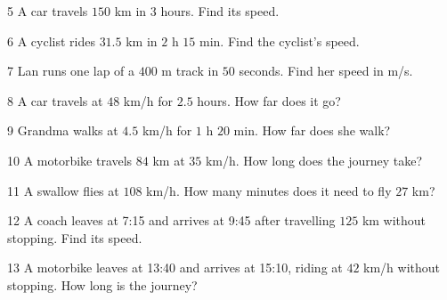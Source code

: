 \gap
\begin{probbox}{5}{\relax}
A car travels $150$ km in $3$ hours. Find its speed.
\end{probbox}
\gap
\begin{probbox}{6}{\relax}
A cyclist rides $31.5$ km in $2$ h $15$ min. Find the cyclist's speed.
\end{probbox}
\gap
\begin{probbox}{7}{\relax}
Lan runs one lap of a $400$ m track in $50$ seconds. Find her speed in m/s.
\end{probbox}
\gap
\begin{probbox}{8}{\relax}
A car travels at $48$ km/h for $2.5$ hours. How far does it go?
\end{probbox}
\gap
\begin{probbox}{9}{\relax}
Grandma walks at $4.5$ km/h for $1$ h $20$ min. How far does she walk?
\end{probbox}
\gap
\begin{probbox}{10}{\relax}
A motorbike travels $84$ km at $35$ km/h. How long does the journey take?
\end{probbox}
\gap
\begin{probbox}{11}{\relax}
A swallow flies at $108$ km/h. How many minutes does it need to fly $27$ km?
\end{probbox}
\gap
\begin{probbox}{12}{\relax}
A coach leaves at 7:15 and arrives at 9:45 after travelling $125$ km without stopping. Find its speed.
\end{probbox}
\gap
\begin{probbox}{13}{\relax}
A motorbike leaves at 13:40 and arrives at 15:10, riding at $42$ km/h without stopping. How long is the journey?
\end{probbox}
